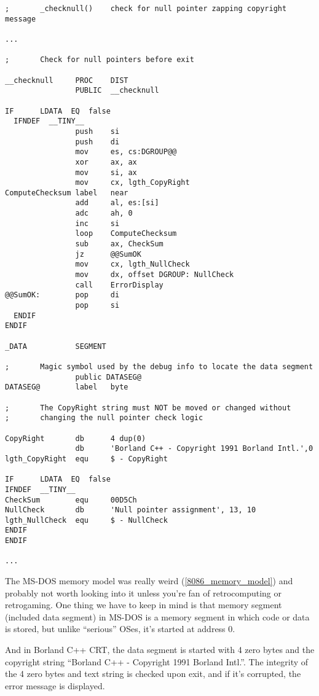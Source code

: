 \begin{lstlisting}[style=customasmx86]
;       _checknull()    check for null pointer zapping copyright message

...

;       Check for null pointers before exit

__checknull     PROC    DIST
                PUBLIC  __checknull

IF      LDATA  EQ  false
  IFNDEF  __TINY__
                push    si
                push    di
                mov     es, cs:DGROUP@@
                xor     ax, ax
                mov     si, ax
                mov     cx, lgth_CopyRight
ComputeChecksum label   near
                add     al, es:[si]
                adc     ah, 0
                inc     si
                loop    ComputeChecksum
                sub     ax, CheckSum
                jz      @@SumOK
                mov     cx, lgth_NullCheck
                mov     dx, offset DGROUP: NullCheck
                call    ErrorDisplay
@@SumOK:        pop     di
                pop     si
  ENDIF
ENDIF

_DATA           SEGMENT

;       Magic symbol used by the debug info to locate the data segment
                public DATASEG@
DATASEG@        label   byte

;       The CopyRight string must NOT be moved or changed without
;       changing the null pointer check logic

CopyRight       db      4 dup(0)
                db      'Borland C++ - Copyright 1991 Borland Intl.',0
lgth_CopyRight  equ     $ - CopyRight

IF      LDATA  EQ  false
IFNDEF  __TINY__
CheckSum        equ     00D5Ch
NullCheck       db      'Null pointer assignment', 13, 10
lgth_NullCheck  equ     $ - NullCheck
ENDIF
ENDIF

...

\end{lstlisting}

The MS-DOS memory model was really weird (\ref{8086_memory_model}) and probably not worth looking into it unless you're fan of retrocomputing or retrogaming.
One thing we have to keep in mind is that memory segment (included data segment) in MS-DOS is a memory segment in which code or data is stored,
but unlike ``serious'' \ac{OS}es, it's started at address 0.

And in Borland C++ \ac{CRT}, the data segment is started with 4 zero bytes and the copyright string ``Borland C++ - Copyright 1991 Borland Intl.''.
The integrity of the 4 zero bytes and text string is checked upon exit, and if it's corrupted, the error message is displayed.


